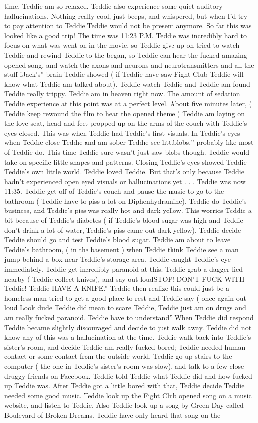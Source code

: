 \documentclass[12pt]{book}
\begin{document}
time. Teddie am so relaxed. Teddie also experience some quiet auditory hallucinations. Nothing really cool, just beeps, and whispered, but when I'd try to pay attention to Teddie Teddie would not be present anymore. So far this was looked like a good trip! The time was 11:23 P.M. Teddie was incredibly hard to focus on what was went on in the movie, so Teddie give up on tried to watch Teddie and rewind Teddie to the began, so Teddie can hear the fucked amazing opened song, and watch the axons and neurons and neurotransmitters and all the stuff iJack's'' brain Teddie showed ( if Teddie have saw Fight Club Teddie will know what Teddie am talked about). Teddie watch Teddie and Teddie am found Teddie really trippy. Teddie am in heaven right now. The amount of sedation Teddie experience at this point was at a perfect level. About five minutes later, ( Teddie keep rewound the film to hear the opened theme ) Teddie am laying on the love seat, head and feet propped up on the arms of the couch with Teddie's eyes closed. This was when Teddie had Teddie's first visuals. In Teddie's eyes when Teddie close Teddie and am sober Teddie see littlblobs,'' probably like most of Teddie do. This time Teddie sure wasn't just saw blobs though. Teddie would take on specific little shapes and patterns. Closing Teddie's eyes showed Teddie Teddie's own little world. Teddie loved Teddie. But that's only because Teddie hadn't experienced open eyed visuals or hallucinations yet . . .  Teddie was now 11:35. Teddie get off of Teddie's couch and pause the music to go to the bathroom ( Teddie have to piss a lot on Diphenhydramine). Teddie do Teddie's business, and Teddie's piss was really hot and dark yellow. This worries Teddie a bit because of Teddie's diabetes ( if Teddie's blood sugar was high and Teddie don't drink a lot of water, Teddie's piss came out dark yellow). Teddie decide Teddie should go and test Teddie's blood sugar. Teddie am about to leave Teddie's bathroom, ( in the basement ) when Teddie think Teddie see a man jump behind a box near Teddie's storage area. Teddie caught Teddie's eye immediately. Teddie get incredibly paranoid at this. Teddie grab a dagger lied nearby ( Teddie collect knives), and say out loudSTOP! DON'T FUCK WITH Teddie! Teddie HAVE A KNIFE.'' Teddie then realize this could just be a homeless man tried to get a good place to rest and Teddie say ( once again out loud Look dude Teddie did mean to scare Teddie, Teddie just am on drugs and am really fucked paranoid. Teddie have to understand'' When Teddie did respond Teddie became slightly discouraged and decide to just walk away. Teddie did not know any of this was a hallucination at the time. Teddie walk back into Teddie's sister's room, and decide Teddie am really fucked bored; Teddie needed human contact or some contact from the outside world. Teddie go up stairs to the computer ( the one in Teddie's sister's room was slow), and talk to a few close druggy friends on Facebook. Teddie told Teddie what Teddie did and how fucked up Teddie was. After Teddie got a little bored with that, Teddie decide Teddie needed some good music. Teddie look up the Fight Club opened song on a music website, and listen to Teddie. Also Teddie look up a song by Green Day called Boulevard of Broken Dreams. Teddie have only heard that song on the 
\end{document}
